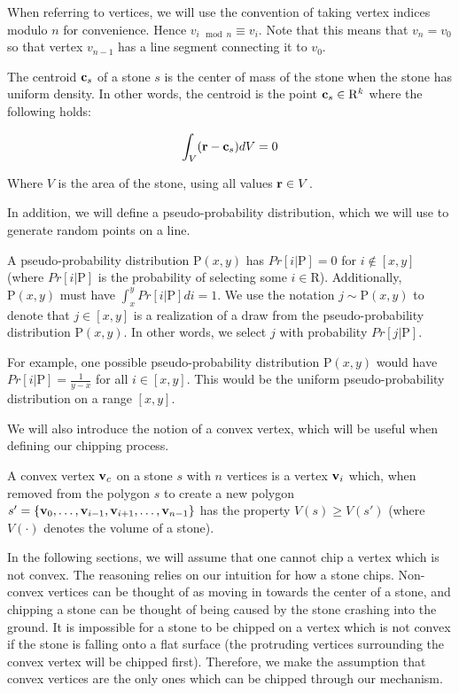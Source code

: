 When referring to vertices, we will use the convention of taking vertex indices modulo $n$ for convenience. Hence $v_{i \mod{n}} \equiv v_i$. Note that this means that $v_{n} = v_{0}$ so that vertex $v_{n-1}$ has a line segment connecting it to $v_{0}$.

The centroid $\mathbf{c}_s$ of a stone $s$ is the center of mass of the stone when the stone has uniform density. In other words, the centroid is the point $\mathbf{c}_s \in \mathrm{R}^k$ where the following holds:

\begin{eqnarray}
 \int_V (\mathbf{r} - \mathbf{c}_s) dV = 0
\end{eqnarray}

Where $V$ is the area of the stone, using all values $\mathbf{r} \in V$. 

In addition, we will define a pseudo-probability distribution, which we will use to generate random points on a line.

\begin{definition}
  A pseudo-probability distribution $\mathrm{P}(x, y)$ has $Pr[i | \mathrm{P}] = 0$ for $i \notin [x,y]$ (where $Pr[i | \mathrm{P}]$ is the probability of selecting some $i \in \mathrm{R}$). Additionally, $\mathrm{P}(x,y)$ must have $\int_{x}^y Pr[i | \mathrm{P}] di = 1$. We use the notation $j \sim \mathrm{P}(x,y)$ to denote that $j \in [x,y]$ is a realization of a draw from the pseudo-probability distribution $\mathrm{P}(x,y)$. In other words, we select $j$ with probability $Pr[j | \mathrm{P}]$.
\end{definition}

For example, one possible pseudo-probability distribution $\mathrm{P}(x,y)$ would have $Pr[i | \mathrm{P}] = \frac{1}{y-x}$ for all $i \in [x,y]$. This would be the uniform pseudo-probability distribution on a range $[x,y]$.

We will also introduce the notion of a convex vertex, which will be useful when defining our chipping process.

\begin{definition}
  A convex vertex $\mathbf{v}_c$ on a stone $s$ with $n$ vertices is a vertex $\mathbf{v}_i$ which, when removed from the polygon $s$ to create a new polygon $s' = \{ \mathbf{v}_0, \ldots, \mathbf{v}_{i-1}, \mathbf{v}_{i+1}, \ldots, \mathbf{v}_{n-1} \}$ has the property $V(s) \geq V(s')$ (where $V(\cdot)$ denotes the volume of a stone).
\end{definition}

In the following sections, we will assume that one cannot chip a vertex which is not convex. The reasoning relies on our intuition for how a stone chips. Non-convex vertices can be thought of as moving in towards the center of a stone, and chipping a stone can be thought of being caused by the stone crashing into the ground. It is impossible for a stone to be chipped on a vertex which is not convex if the stone is falling onto a flat surface (the protruding vertices surrounding the convex vertex will be chipped first). Therefore, we make the assumption that convex vertices are the only ones which can be chipped through our mechanism.

